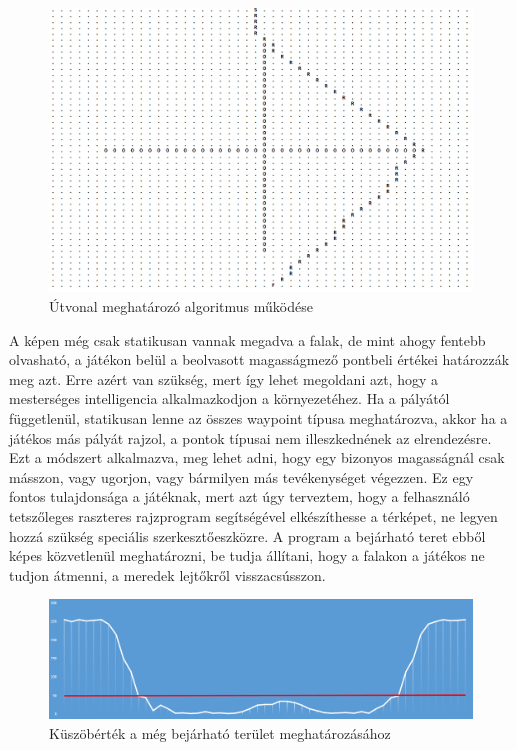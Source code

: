 \begin{figure}[h]
\centering
\includegraphics[scale=0.22]{kepek/mi_printscreen.png}
\caption{Útvonal meghatározó algoritmus működése}
\label{fig:mi_printscreen}
\end{figure}

A képen még csak statikusan vannak megadva a falak, de mint ahogy fentebb olvasható, a játékon belül a beolvasott magasságmező pontbeli értékei határozzák meg azt. Erre azért van szükség, mert így lehet megoldani azt, hogy a mesterséges intelligencia alkalmazkodjon a környezetéhez. Ha a pályától függetlenül, statikusan lenne az összes waypoint típusa meghatározva, akkor ha a játékos más pályát rajzol, a pontok típusai nem illeszkednének az elrendezésre. Ezt a módszert alkalmazva, meg lehet adni, hogy egy bizonyos magasságnál csak másszon, vagy ugorjon, vagy bármilyen más tevékenységet végezzen. Ez egy fontos tulajdonsága a játéknak, mert azt úgy terveztem, hogy a felhasználó tetszőleges raszteres rajzprogram segítségével elkészíthesse a térképet, ne legyen hozzá szükség speciális szerkesztőeszközre. A program a bejárható teret ebből képes közvetlenül meghatározni, be tudja állítani, hogy a falakon a játékos ne tudjon átmenni, a meredek lejtőkről visszacsússzon.

\begin{figure}[h]
\centering
\includegraphics[scale=0.42]{kepek/magassagmezo_kuszobertek_diagram.png}
\caption{Küszöbérték a még bejárható terület meghatározásához}
\label{fig:kuszobertek}
\end{figure}

